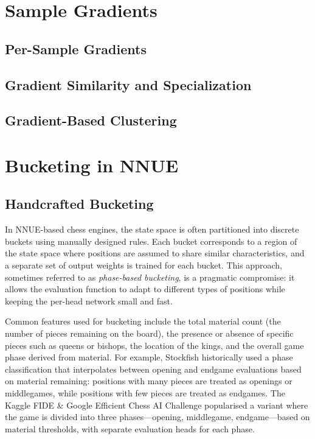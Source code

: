 \section{Sample Gradients}\label{sec:sample-gradients}

\subsection{Per-Sample Gradients}\label{sec:per-sample-gradients}


\subsection{Gradient Similarity and Specialization}\label{sec:gradient-similarity}


\subsection{Gradient-Based Clustering}\label{sec:gradient-clustering-bg}


\section{Bucketing in NNUE}\label{sec:nnue-bucketing}

\subsection{Handcrafted Bucketing}\label{sec:handcrafted-bucketing}

In NNUE-based chess engines, the state space is often partitioned into discrete buckets using manually designed rules. Each bucket corresponds to a region of the state space where positions are assumed to share similar characteristics, and a separate set of output weights is trained for each bucket. This approach, sometimes referred to as \emph{phase-based bucketing}, is a pragmatic compromise: it allows the evaluation function to adapt to different types of positions while keeping the per-head network small and fast.

Common features used for bucketing include the total material count (the number of pieces remaining on the board), the presence or absence of specific pieces such as queens or bishops, the location of the kings, and the overall game phase derived from material. For example, Stockfish historically used a phase classification that interpolates between opening and endgame evaluations based on material remaining: positions with many pieces are treated as openings or middlegames, while positions with few pieces are treated as endgames. The Kaggle FIDE \& Google Efficient Chess AI Challenge popularised a variant where the game is divided into three phases---opening, middlegame, endgame---based on material thresholds, with separate evaluation heads for each phase.

